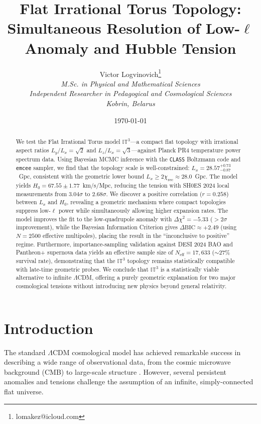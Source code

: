 \documentclass[a4paper,11pt]{article}
\title{
    \textbf{Flat Irrational Torus Topology: \\ Simultaneous Resolution of Low-$\ell$ Anomaly and Hubble Tension}
}
\author{
    Victor Logvinovich\thanks{lomakez@icloud.com} \\
    \textit{M.Sc. in Physical and Mathematical Sciences} \\
    \textit{Independent Researcher in Pedagogical and Cosmological Sciences} \\
    \textit{Kobrin, Belarus}
}
\date{\today}
\begin{document}
\maketitle

\begin{abstract}
We test the Flat Irrational Torus model $\mathbb{IT}^3$---a compact flat topology with irrational aspect ratios $L_y/L_x = \sqrt{2}$ and $L_z/L_x = \sqrt{3}$---against Planck PR4 temperature power spectrum data. Using Bayesian MCMC inference with the \texttt{CLASS} Boltzmann code and \texttt{emcee} sampler, we find that the topology scale is well-constrained: $L_x = 28.57^{+0.73}_{-0.87}$~Gpc, consistent with the geometric lower bound $L_x \geq 2\chi_{\text{rec}} \approx 28.0$~Gpc. The model yields $H_0 = 67.55 \pm 1.77$~km/s/Mpc, reducing the tension with SH0ES 2024 local measurements from $3.04\sigma$ to $2.68\sigma$. We discover a positive correlation ($r=0.258$) between $L_x$ and $H_0$, revealing a geometric mechanism where compact topologies suppress low-$\ell$ power while simultaneously allowing higher expansion rates. The model improves the fit to the low-quadrupole anomaly with $\Delta\chi^2 = -5.33$ ($>2\sigma$ improvement), while the Bayesian Information Criterion gives $\Delta\text{BIC} \approx +2.49$ (using $N=2500$ effective multipoles), placing the result in the ``inconclusive to positive'' regime. Furthermore, importance-sampling validation against DESI 2024 BAO and Pantheon+ supernova data yields an effective sample size of $N_{\text{eff}} = 17,633$ ($\sim 27\%$ survival rate), demonstrating that the $\mathbb{IT}^3$ topology remains statistically compatible with late-time geometric probes. We conclude that $\mathbb{IT}^3$ is a statistically viable alternative to infinite $\Lambda$CDM, offering a purely geometric explanation for two major cosmological tensions without introducing new physics beyond general relativity.
\end{abstract}

\section{Introduction}

The standard $\Lambda$CDM cosmological model has achieved remarkable success in describing a wide range of observational data, from the cosmic microwave background (CMB) to large-scale structure \citep{Planck2018}. However, several persistent anomalies and tensions challenge the assumption of an infinite, simply-connected flat universe.
\end{document}
